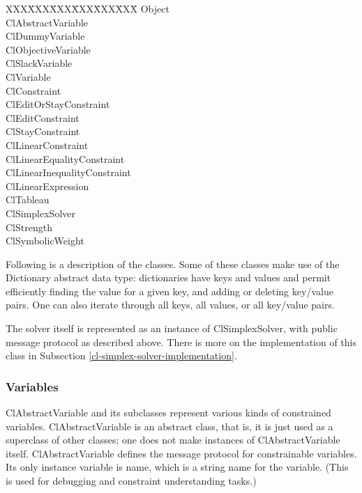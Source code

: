 \documentclass{article}
\begin{document}
\begin{tabbing}
XXX\=XXX\=XXX\=XXX\=XXX\=XXX\=   \kill
\> {\sf Object} \\
\> \> {\sf ClAbstractVariable} \\
\> \> \> {\sf ClDummyVariable} \\
\> \> \> {\sf ClObjectiveVariable} \\
\> \> \> {\sf ClSlackVariable} \\
\> \> \> {\sf ClVariable} \\
\> \> {\sf ClConstraint} \\
\> \> \> {\sf ClEditOrStayConstraint} \\
\> \> \> \> {\sf ClEditConstraint} \\
\> \> \> \> {\sf ClStayConstraint} \\
\> \> \> {\sf ClLinearConstraint} \\
\> \> \> \> {\sf ClLinearEqualityConstraint} \\
\> \> \> \> {\sf ClLinearInequalityConstraint} \\
\> \> {\sf ClLinearExpression} \\
\> \> {\sf ClTableau} \\
\> \> \> {\sf ClSimplexSolver} \\
\> \> {\sf ClStrength} \\
\> \> {\sf ClSymbolicWeight}
\end{tabbing}

Following is a description of the classes.  Some of these classes make
use of the Dictionary abstract data type: dictionaries have keys and
values and permit efficiently finding the value
for a given key, and adding or deleting key/value pairs.  One can also
iterate through all keys, all values, or all key/value pairs.

The solver itself is represented as an instance of {\sf ClSimplexSolver},
with public message protocol as described above.  There is more on the
implementation of this class in Subsection 
\ref{cl-simplex-solver-implementation}.

\subsubsection{Variables}

{\sf ClAbstractVariable} and its subclasses represent various kinds of
constrained variables.  {\sf ClAbstractVariable} is an abstract class, that
is, it is just used as a superclass of other classes; one does not make
instances of {\sf ClAbstractVariable} itself.  {\sf ClAbstractVariable}
defines the message protocol for constrainable variables.  Its only
instance variable is {\sf name}, which is a string name for the variable.
(This is used for debugging and constraint understanding tasks.)
\end{document}
